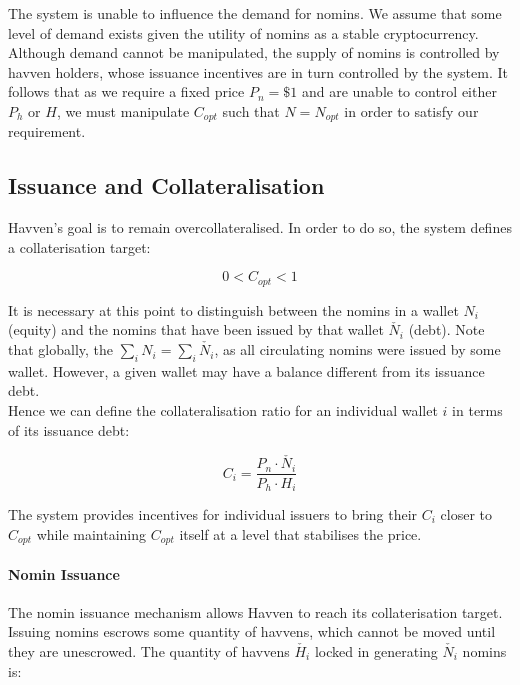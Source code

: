 \noindent The system is unable to influence the demand for nomins. We assume that some level of demand exists given the utility of nomins as a stable cryptocurrency. Although demand cannot be manipulated, the supply of nomins is controlled by havven holders, whose issuance incentives are in turn controlled by the system. It follows that as we require a fixed price $P_n = \$1 $ and are unable to control either $P_h$ or $H$, we must manipulate $C_{opt}$ such that $N = N_{opt}$ in order to satisfy our requirement.

\subsection{Issuance and Collateralisation} 


\noindent Havven's goal is to remain overcollateralised. In order to do so, the system defines a collaterisation target:

\begin{equation}
0 < C_{opt} < 1  \label{eq:2}
\end{equation}

\noindent It is necessary at this point to distinguish between the nomins in a wallet $N_i$ (equity) and the nomins that have been issued by that wallet $\check{N_i}$ (debt). Note that globally, the $\sum_{i}N_i = \sum_{i}\check{N_i}$, as all circulating nomins were issued by some wallet. However, a given wallet may have a balance different from its issuance debt.\\

\noindent Hence we can define the collateralisation ratio for an individual wallet $i$ in terms of its issuance debt:

\begin{equation}
C_i = \frac{P_n \cdot \check{N_i}}{P_h \cdot H_i}  \label{eq:3}
\end{equation}

\noindent The system provides incentives for individual issuers to bring their $C_i$ closer to $C_{opt}$ while maintaining $C_{opt}$ itself at a level that stabilises the price.

\paragraph{Nomin Issuance}

\noindent The nomin issuance mechanism allows Havven to reach its collaterisation target. Issuing nomins escrows some quantity of havvens, which cannot be moved until they are unescrowed. The quantity of havvens $\check{H_i}$ locked in generating $\check{N_i}$ nomins is:

